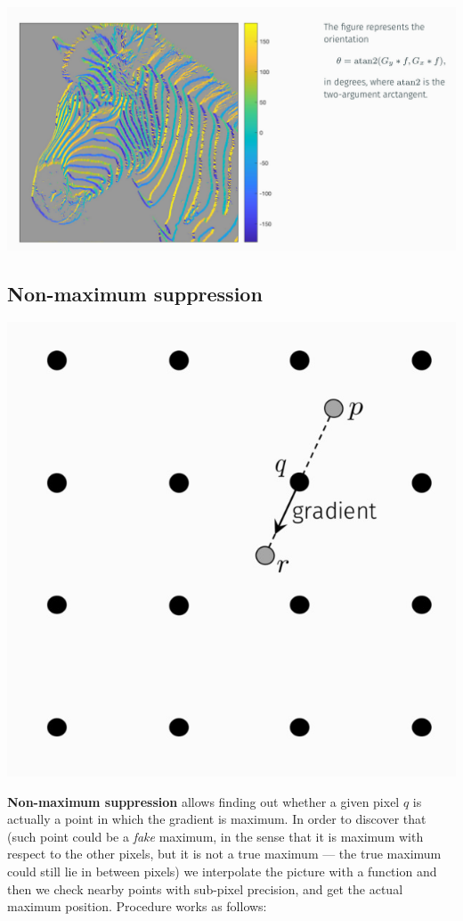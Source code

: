 \documentclass[10pt]{report}
\begin{document}
\begin{center}
\includegraphics[width=.9\linewidth]{./pics/det/zebra-4.jpg}
\end{center}

\subsection{Non-maximum suppression}
\label{sec:org69798c5}
\begin{center}
\includegraphics[scale=0.3]{./pics/det/non-maximum-suppression.jpg}
\end{center}

\textbf{Non-maximum suppression} allows finding out whether a given pixel \(q\)
is actually a point in which the gradient is maximum. In order to
discover that (such point could be a \emph{fake} maximum, in the sense that
it is maximum with respect to the other pixels, but it is not a true
maximum --- the true maximum could still lie in between pixels) we interpolate
the picture with a function and then we check nearby points with sub-pixel
precision, and get the actual maximum position. Procedure works as follows:
\end{document}
